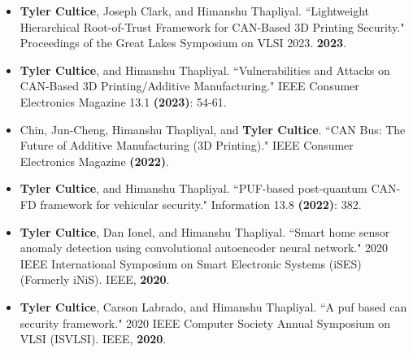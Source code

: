 \documentclass[line,margin,9pt]{res}
\begin{document}
\begin{resume}
\begin{itemize}
\item \textbf{Tyler Cultice}, Joseph Clark, and Himanshu Thapliyal. ``Lightweight Hierarchical Root-of-Trust Framework for CAN-Based 3D Printing Security." Proceedings of the Great Lakes Symposium on VLSI 2023. \textbf{2023}.

\item \textbf{Tyler Cultice}, and Himanshu Thapliyal. ``Vulnerabilities and Attacks on CAN-Based 3D Printing/Additive Manufacturing." IEEE Consumer Electronics Magazine 13.1 \textbf{(2023)}: 54-61.

\item Chin, Jun-Cheng, Himanshu Thapliyal, and \textbf{Tyler Cultice}. ``CAN Bus: The Future of Additive Manufacturing (3D Printing)." IEEE Consumer Electronics Magazine \textbf{(2022)}.

\item \textbf{Tyler Cultice}, and Himanshu Thapliyal. ``PUF-based post-quantum CAN-FD framework for vehicular security." Information 13.8 \textbf{(2022)}: 382.

\item \textbf{Tyler Cultice}, Dan Ionel, and Himanshu Thapliyal. ``Smart home sensor anomaly detection using convolutional autoencoder neural network." 2020 IEEE International Symposium on Smart Electronic Systems (iSES)(Formerly iNiS). IEEE, \textbf{2020}.

\item \textbf{Tyler Cultice}, Carson Labrado, and Himanshu Thapliyal. ``A puf based can security framework." 2020 IEEE Computer Society Annual Symposium on VLSI (ISVLSI). IEEE, \textbf{2020}.

\end{itemize}


\end{resume}
\end{document}
